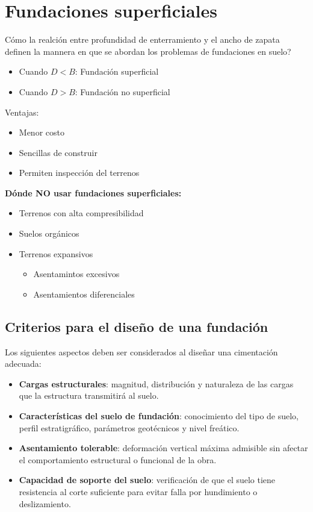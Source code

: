 \documentclass{article} %
\begin{document}
\newpage
\section{Fundaciones superficiales}
Cómo la realción entre profundidad de enterramiento y el ancho de zapata definen la mannera en que se abordan los problemas de fundaciones en suelo?

\begin{itemize}
    \item Cuando $D<B$: Fundación superficial
    \item Cuando $D>B$: Fundación no superficial
\end{itemize}

Ventajas:
\begin{itemize}
    \item Menor costo
    \item Sencillas de construir
    \item Permiten inspección del terrenos
\end{itemize}

\textbf{Dónde NO usar fundaciones superficiales:}
\begin{itemize}
    \item Terrenos con alta compresibilidad
    \item Suelos orgánicos
    \item Terrenos expansivos
    \begin{itemize}
        \item Asentamintos excesivos
        \item Asentamientos diferenciales
    \end{itemize}
\end{itemize}

\subsection*{Criterios para el diseño de una fundación}

Los siguientes aspectos deben ser considerados al diseñar una cimentación adecuada:

\begin{itemize}
    \item \textbf{Cargas estructurales}: magnitud, distribución y naturaleza de las cargas que la estructura transmitirá al suelo.
    \item \textbf{Características del suelo de fundación}: conocimiento del tipo de suelo, perfil estratigráfico, parámetros geotécnicos y nivel freático.
    \item \textbf{Asentamiento tolerable}: deformación vertical máxima admisible sin afectar el comportamiento estructural o funcional de la obra.
    \item \textbf{Capacidad de soporte del suelo}: verificación de que el suelo tiene resistencia al corte suficiente para evitar falla por hundimiento o deslizamiento.
\end{itemize}
\end{document}
